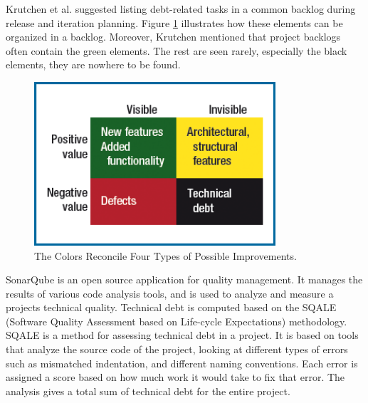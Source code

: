 {%
Krutchen et al.\cite{krutchen} suggested listing debt-related tasks in a common backlog during release and iteration planning. Figure \ref{fig:fourColorBacklog} illustrates how these elements can be organized in a backlog. Moreover, Krutchen mentioned that project backlogs often contain the green elements. The rest are seen rarely, especially the black elements, they are nowhere to be found.


\begin{figure}[ht!]
	\centering
	\includegraphics[width=0.8\textwidth]{images/fourColorBacklog.png}
	\caption{The Colors Reconcile Four Types of Possible Improvements.}
	\label{fig:fourColorBacklog}
\end{figure}

SonarQube is an open source application for quality management\cite{sonarsource2013sonarqube}. It manages the results of various code analysis tools, and is used to analyze and measure a projects technical quality. Technical debt is computed based on the SQALE (Software Quality Assessment based on Life-cycle Expectations) methodology\cite{letouzey2012sqale}. SQALE is a method for assessing technical debt in a project. It is based on tools that analyze the source code of the project, looking at different types of errors such as mismatched indentation, and different naming conventions. Each error is assigned a score based on how much work it would take to fix that error. The analysis gives a total sum of technical debt for the entire project.






}
